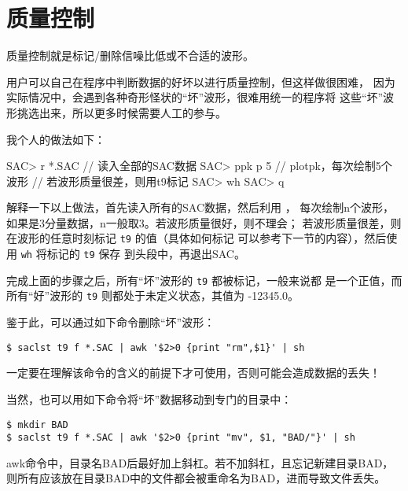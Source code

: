 \section{质量控制}

质量控制就是标记/删除信噪比低或不合适的波形。

用户可以自己在程序中判断数据的好坏以进行质量控制，但这样做很困难，
因为实际情况中，会遇到各种奇形怪状的``坏''波形，很难用统一的程序将
这些``坏''波形挑选出来，所以更多时候需要人工的参与。

我个人的做法如下：
\begin{SACCode}
SAC> r *.SAC        // 读入全部的SAC数据
SAC> ppk p 5        // plotpk，每次绘制5个波形
// 若波形质量很差，则用t9标记
SAC> wh
SAC> q
\end{SACCode}

解释一下以上做法，首先读入所有的SAC数据，然后利用 ，
每次绘制n个波形，如果是3分量数据，n一般取3。若波形质量很好，则不理会；
若波形质量很差，则在波形的任意时刻标记 \texttt{t9} 的值（具体如何标记
可以参考下一节的内容），然后使用 \texttt{wh} 将标记的 \texttt{t9} 保存
到头段中，再退出SAC。

完成上面的步骤之后，所有``坏''波形的 \texttt{t9} 都被标记，一般来说都
是一个正值，而所有``好''波形的 \texttt{t9} 则都处于未定义状态，其值为
-12345.0。

鉴于此，可以通过如下命令删除``坏''波形：
\begin{verbatim}
$ saclst t9 f *.SAC | awk '$2>0 {print "rm",$1}' | sh
\end{verbatim}
\begin{note}
一定要在理解该命令的含义的前提下才可使用，否则可能会造成数据的丢失！
\end{note}

当然，也可以用如下命令将``坏''数据移动到专门的目录中：
\begin{verbatim}
$ mkdir BAD
$ saclst t9 f *.SAC | awk '$2>0 {print "mv", $1, "BAD/"}' | sh
\end{verbatim}
\begin{note}
awk命令中，目录名BAD后最好加上斜杠。若不加斜杠，且忘记新建目录BAD，
则所有应该放在目录BAD中的文件都会被重命名为BAD，进而导致文件丢失。
\end{note}
